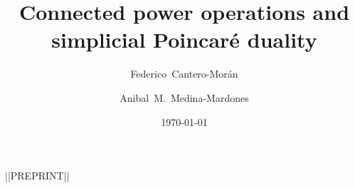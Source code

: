 \documentclass{amsart}
\title{Connected power operations and simplicial Poincar\'e duality}
\author[Cantero-Mor\'an]{Federico~Cantero-Mor\'an}
\author[Medina-Mardones]{Anibal~M.~Medina-Mardones}
\date{\today}
\begin{document}
	\begin{center}
		||PREPRINT||
		\vskip 20pt
	\end{center}
	
	\maketitle
	\tableofcontents
 \newpage
	
	
	
	
	
	
	
	
	
	
	
	
	
	\sloppy
	\printbibliography
\end{document}
